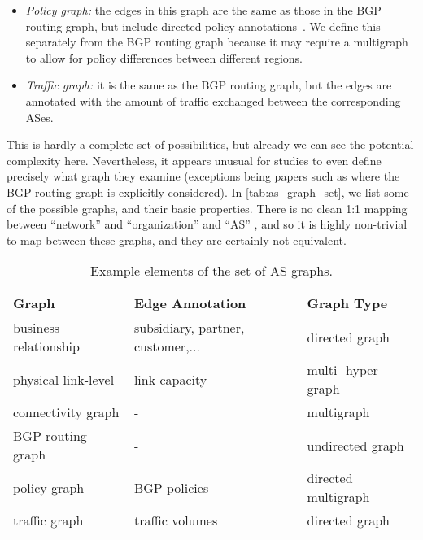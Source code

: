 \begin{itemize}
\item {\em Policy graph:}  the edges in this graph are the same as
  those in the BGP routing graph, but include directed policy
  annotations~\cite{tim10:ssp}. We define this separately from the BGP routing graph
  because it may require a multigraph to allow for policy differences
  between different regions. 

\item {\em Traffic graph:} it is the same as the BGP routing graph,
  but the edges are annotated with the amount of traffic exchanged
  between the corresponding ASes.

\end{itemize} 

This is hardly a complete set of possibilities, but already we can see
the potential complexity here. Nevertheless, it appears unusual for studies to
even define precisely what graph they examine (exceptions being papers
such as \cite{govindan97:_topology,oliveira10:_incompl_of_obser_inter}
where the BGP routing graph is explicitly considered).  In
\autoref{tab:as_graph_set}, we list some of the possible graphs, and
their basic properties.  There is no clean 1:1 mapping between
``network'' and ``organization'' and ``AS''
\cite{hyun03:_tracer_and_bgp,cai10:_AS_to_organ_map}, and so it is
highly non-trivial to map between these graphs, and they are certainly
not equivalent.


\begin{table*}[t]
\begin{center}
  \begin{tabular}{|l|l|l|}
    \hline 
    Graph & Edge Annotation & Graph Type \\
    \hline 
    business relationship & subsidiary, partner, customer,... & directed graph \\
    physical link-level & link capacity & multi- hyper-graph \\
    connectivity graph & - & multigraph \\
    BGP routing graph & - & undirected graph \\
    policy graph & BGP policies & directed multigraph \\
    traffic graph & traffic volumes & directed graph \\
     \hline 
  \end{tabular}
  \caption{Example elements of the set of AS graphs.}
  \label{tab:as_graph_set}
\end{center}
\end{table*}


